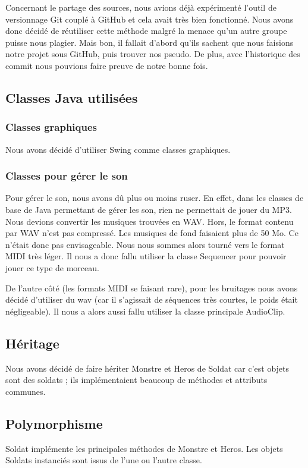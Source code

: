 \documentclass{article}
\begin{document}
  Concernant le partage des sources, nous avions déjà expérimenté l'outil de versionnage Git couplé à GitHub et cela avait très bien fonctionné.
  Nous avons donc décidé de réutiliser cette méthode malgré la menace qu'un autre groupe puisse nous plagier. Mais bon, il fallait d'abord qu'ils sachent que nous faisions notre projet sous GitHub, puis trouver nos pseudo.
  De plus, avec l'historique des commit nous pouvions faire preuve de notre bonne fois.


\subsection{Classes Java utilisées}
  \subsubsection{Classes graphiques} Nous avons décidé d'utiliser Swing comme classes graphiques. %
  
  \subsubsection{Classes pour gérer le son}
  Pour gérer le son, nous avons dû plus ou moins ruser.
  En effet, dans les classes de base de Java permettant de gérer les son, rien ne permettait de jouer du MP3.
  Nous devions convertir les musiques trouvées en WAV. Hors, le format contenu par WAV n'est pas compressé.
  Les musiques de fond faisaient plus de 50 Mo. Ce n'était donc pas envisageable.
  Nous nous sommes alors tourné vers le format MIDI très léger.
  Il nous a donc fallu utiliser la classe Sequencer pour pouvoir jouer ce type de morceau.
  
  De l'autre côté (les formats MIDI se faisant rare), pour les bruitages nous avons décidé d'utiliser du wav (car il s'agissait de séquences très courtes, le poids était négligeable).
  Il nous a alors aussi fallu utiliser la classe principale AudioClip.

  \subsection{Héritage}
  Nous avons décidé de faire hériter Monstre et Heros de Soldat car c'est objets sont des soldats ; ils implémentaient beaucoup de méthodes et attributs communes.

  \subsection{Polymorphisme}
  Soldat implémente les principales méthodes de Monstre et Heros.
  Les objets Soldats instanciés sont issus de l'une ou l'autre classe.
  
\end{document}

